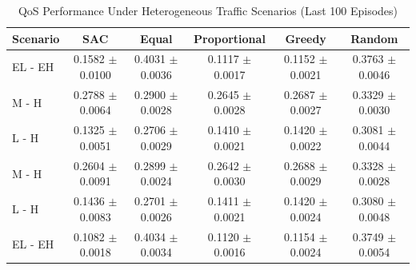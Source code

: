 \begin{table}[!t]
\centering
\caption{QoS Performance Under Heterogeneous Traffic Scenarios (Last 100 Episodes)}
\label{tab:heterogeneous_comparison}
\begin{tabular}{lccccc}
\toprule
\textbf{Scenario} & \textbf{SAC} & \textbf{Equal} & \textbf{Proportional} & \textbf{Greedy} & \textbf{Random} \\
\midrule
EL - EH & 0.1582 $\pm$ 0.0100 & 0.4031 $\pm$ 0.0036 & 0.1117 $\pm$ 0.0017 & 0.1152 $\pm$ 0.0021 & 0.3763 $\pm$ 0.0046 \\
M - H & 0.2788 $\pm$ 0.0064 & 0.2900 $\pm$ 0.0028 & 0.2645 $\pm$ 0.0028 & 0.2687 $\pm$ 0.0027 & 0.3329 $\pm$ 0.0030 \\
L - H & 0.1325 $\pm$ 0.0051 & 0.2706 $\pm$ 0.0029 & 0.1410 $\pm$ 0.0021 & 0.1420 $\pm$ 0.0022 & 0.3081 $\pm$ 0.0044 \\
M - H & 0.2604 $\pm$ 0.0091 & 0.2899 $\pm$ 0.0024 & 0.2642 $\pm$ 0.0030 & 0.2688 $\pm$ 0.0029 & 0.3328 $\pm$ 0.0028 \\
L - H & 0.1436 $\pm$ 0.0083 & 0.2701 $\pm$ 0.0026 & 0.1411 $\pm$ 0.0021 & 0.1420 $\pm$ 0.0024 & 0.3080 $\pm$ 0.0048 \\
EL - EH & 0.1082 $\pm$ 0.0018 & 0.4034 $\pm$ 0.0034 & 0.1120 $\pm$ 0.0016 & 0.1154 $\pm$ 0.0024 & 0.3749 $\pm$ 0.0054 \\
\bottomrule
\end{tabular}
\end{table}
